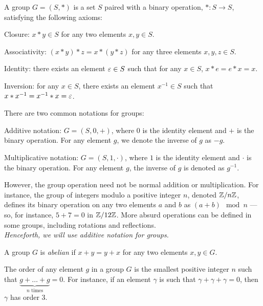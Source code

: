 \begin{definition}
  A group $G = (S, \ast)$ is a set $S$ paired with a binary operation,
  $\ast : S \to S$, satisfying the following axioms:
  \begin{enumroman}
    \item Closure: $x \ast y \in S$ for any two elements $x, y \in S$.
    \item Associativity: $(x \ast y) \ast z = x \ast (y \ast z)$
      for any three elements $x, y, z \in S$.
    \item Identity: there exists an element $\varepsilon \in S$ such that
      for any $x \in S$, $x \ast e = e \ast x = x$.
    \item Inversion: for any $x \in S$, there exists an element
      $x^{-1} \in S$ such that $x \ast x^{-1} = x^{-1} \ast x = \varepsilon$.
  \end{enumroman}
  There are two common notations for groups:
  \begin{enumroman}
    \item Additive notation: $G = (S, 0, +)$, where $0$ is the identity
      element and $+$ is the binary operation.
      For any element $g$, we denote the inverse of $g$ as $-g$.
    \item Multiplicative notation: $G = (S, 1, \cdot)$, where $1$ is the
      identity element and $\cdot$ is the binary operation.
      For any element $g$, the inverse of $g$ is denoted as $g^{-1}$.
  \end{enumroman}

  However, the group operation need not be normal addition or multiplication.
  For instance, the group of integers modulo a positive integer $n$,
  denoted $\mathbb{Z}/n\mathbb{Z}$, defines its binary operation on any two elements $a$ and $b$
  as $(a + b) \mod n$ --- so, for instance, $5 + 7 = 0$ in $\mathbb{Z}/12\mathbb{Z}$.
  More absurd operations can be defined in some groups, including
  rotations and reflections.\\
  \emph{Henceforth, we will use additive notation for groups.}
\end{definition}

\begin{definition}
  A group $G$ is \emph{abelian} if $x + y = y + x$ for any two
  elements $x, y \in G$.
\end{definition}

\begin{definition}
  The order of any element $g$ in a group $G$ is the smallest positive
  integer $n$ such that $\underbrace{ g + \ldots + g}_{\text{$n$ times}} = 0$.
  For instance, if an element $\gamma$ is such that  $\gamma + \gamma + \gamma = 0$,
  then $\gamma$ has order $3$.
\end{definition}


